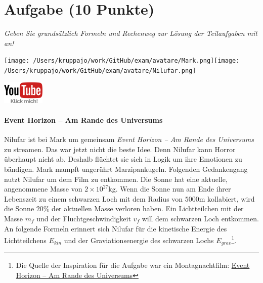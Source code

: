\documentclass[a4paper, 9pt]{scrartcl}\usepackage[]{graphicx}\usepackage[]{xcolor}
\begin{document}
\section{Aufgabe \hfill (10 Punkte)}

\textit{Geben Sie grundsätzlich Formeln und Rechenweg zur Lösung der Teilaufgaben mit an!} \\[1Ex]
 

 
\ifcollection
\begin{flushright}
\tiny\vspace{-3Ex}
\textbf{\examinhaltstart}
\exammodulemathstat
\vspace{-4Ex}
\end{flushright}
\begin{minipage}[t]{0.5\textwidth}
\texttt{[image: /Users/kruppajo/work/GitHub/exam/avatare/Mark.png]}\hspace{-4mm}\texttt{[image: /Users/kruppajo/work/GitHub/exam/avatare/Nilufar.png]}
\end{minipage}
\begin{minipage}[t]{0.5\textwidth}
\hfill
\href{https://youtu.be/q-qYK4Chslg}{\includegraphics[width = 2cm]{img/youtube}}
\end{minipage}
\fi



\ifcollection
\paragraph{Event Horizon -- Am Rande des Universums}
\fi



Nilufar ist bei Mark um gemeinsam \textit{Event Horizon -- Am Rande des Universums} zu streamen. Das war jetzt nicht die beste Idee. Denn Nilufar kann Horror überhaupt nicht ab. Deshalb flüchtet sie sich in Logik um ihre Emotionen zu bändigen. Mark mampft ungerührt Marzipankugeln. Folgenden Gedankengang nutzt Nilufar um dem Film zu entkommen. Die Sonne hat eine aktuelle, angenommene Masse von $\ensuremath{2\times 10^{27}}$kg. Wenn die Sonne nun am Ende ihrer Lebenszeit zu einem schwarzen Loch mit dem Radius von $5000$m kollabiert, wird die Sonne $20$\% der aktuellen Masse verloren haben. Ein Lichtteilchen mit der Masse $m_f$ und der Fluchtgeschwindigkeit $v_f$ will dem schwarzen Loch entkommen. An folgende Formeln erinnert sich Nilufar für die kinetische Energie des Lichtteilchens $E_{kin}$ und der Graviationsenergie des schwarzen Lochs $E_{grav}$\footnote{Die Quelle der Inspiration für die Aufgabe war ein Montagnachtfilm: \href{https://de.wikipedia.org/wiki/Event_Horizon_–_Am_Rande_des_Universums}{Event Horizon – Am Rande des Universums}}.
\end{document}
